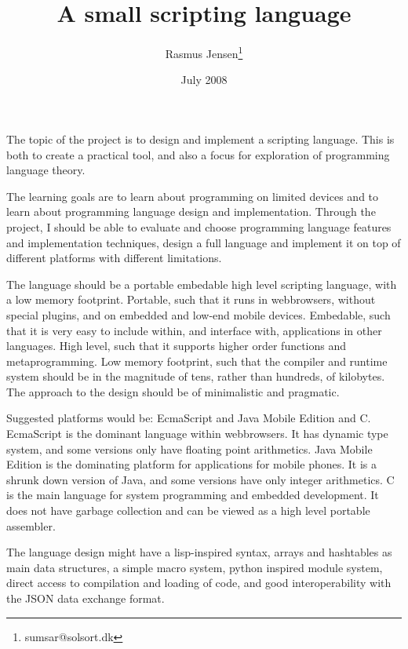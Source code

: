 \documentclass[12pt]{article}
\title{A small scripting language}
\author{
  Rasmus Jensen\footnote{
    sumsar@solsort.dk
  }
}
\date{July 2008}
\begin{document}
\maketitle






The topic of the project is to design and implement a scripting language.
This is both to create a practical tool, 
and also a focus for exploration of programming language theory.

The learning goals are to learn about programming on limited devices and to learn about programming language design and implementation. 
Through the project, I should be able to evaluate and choose programming language features and implementation techniques, design a full language and implement it on top of different platforms with different limitations.

The language should be a portable embedable high level scripting language, with a low memory footprint. 
Portable, such that it runs in webbrowsers, without special plugins, and on embedded and low-end mobile devices. 
Embedable, such that it is very easy to include within, and interface with, applications in other languages.
High level, such that it supports higher order functions and metaprogramming.
Low memory footprint, such that the compiler and runtime system should be in the magnitude of tens, rather than hundreds, of kilobytes.
The approach to the design should be of minimalistic and pragmatic.

Suggested platforms would be: EcmaScript and Java Mobile Edition and C. 
EcmaScript is the dominant language within webbrowsers. It has dynamic type system, and some versions only have floating point arithmetics.
Java Mobile Edition is the dominating platform for applications for mobile phones. It is a shrunk down version of Java, and some versions have only integer arithmetics.
C is the main language for system programming and embedded development. It does not have garbage collection and can be viewed as a high level portable assembler.

The language design might have a lisp-inspired syntax, arrays and hashtables as main data structures, a simple macro system, python inspired module system, direct access to compilation and loading of code, and good interoperability with the JSON data exchange format.
\end{document}

